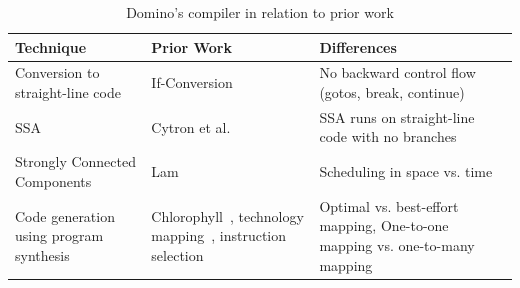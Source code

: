 \begin{table}[!t]
  \centering
  \begin{small}
    \begin{tabular}{|p{}|p{}|p{}|}
  \hline
  Technique & Prior Work & Differences \\
  \hline
  Conversion to straight-line code & If-Conversion~\cite{if_conversion} & No backward control flow (gotos, break, continue) \\
  \hline
  SSA & Cytron et al.~\cite{ssa} & SSA runs on straight-line code with no branches \\
  \hline
  Strongly Connected Components & Lam~\cite{software_pipelining} & Scheduling in space vs. time \\
  \hline
  Code generation using program synthesis & Chlorophyll~\cite{chlorophyll}, technology mapping~\cite{micheli}, instruction selection~\cite{dragonbook} & Optimal vs. best-effort mapping, One-to-one mapping vs. one-to-many mapping \\
  \hline
  \end{tabular}
  \end{small}
  \caption{Domino's compiler in relation to prior work}
  \label{tab:prior_compiler}
\end{table}
